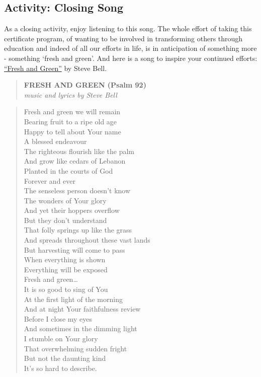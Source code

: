 \documentclass[
]{book}
\begin{document}
\hypertarget{activity-closing-song}{%
\subsection*{Activity: Closing Song}\label{activity-closing-song}}

\begin{reflect}
As a closing activity, enjoy listening to this song. The whole effort of taking this certificate program, of wanting to be involved in transforming others through education and indeed of all our efforts in life, is in anticipation of something more - something `fresh and green'. And here is a song to inspire your continued efforts: \href{https://www.youtube.com/watch?v=uKjVQ5VSaXc}{``Fresh and Green''} by Steve Bell.

\begin{quote}
\textbf{FRESH AND GREEN (Psalm 92)}\\
\emph{music and lyrics by Steve Bell}
\end{quote}

\begin{quote}
Fresh and green we will remain\\
Bearing fruit to a ripe old age\\
Happy to tell about Your name\\
A blessed endeavour\\
The righteous flourish like the palm\\
And grow like cedars of Lebanon\\
Planted in the courts of God\\
Forever and ever\\
The senseless person doesn't know\\
The wonders of Your glory\\
And yet their hoppers overflow\\
But they don't understand\\
That folly springs up like the grass\\
And spreads throughout these vast lands\\
But harvesting will come to pass\\
When everything is shown\\
Everything will be exposed\\
Fresh and green\ldots{}\\
It is so good to sing of You\\
At the first light of the morning\\
And at night Your faithfulness review\\
Before I close my eyes\\
And sometimes in the dimming light\\
I stumble on Your glory\\
That overwhelming sudden fright\\
But not the daunting kind\\
It's so hard to describe.
\end{quote}
\end{reflect}
\end{document}

